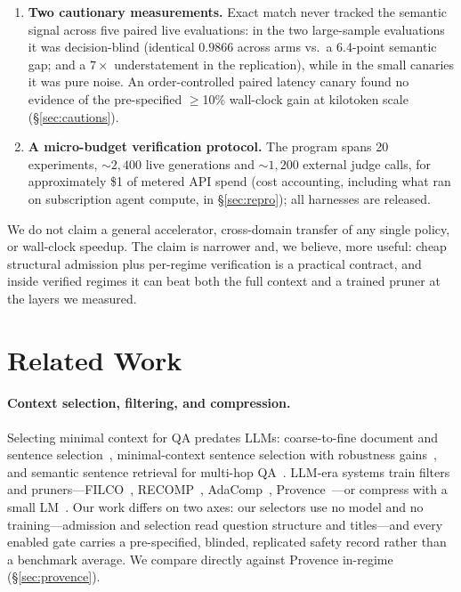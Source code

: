 \documentclass[11pt]{article}
\begin{document}
\begin{enumerate}
aggressive sentence pruners, and Provence may be out-of-domain here; full
caveats in \S\ref{sec:provence}.
\item \textbf{Two cautionary measurements.} Exact match never tracked the
semantic signal across five paired live evaluations: in the two large-sample
evaluations it was decision-blind (identical
$0.9866$ across arms vs.\ a 6.4-point semantic gap; and a $7\times$
understatement in the replication), while in the small canaries it was
pure noise. An order-controlled
paired latency canary found no evidence of the pre-specified
$\ge$10\% wall-clock gain at kilotoken scale (\S\ref{sec:cautions}).
\item \textbf{A micro-budget verification protocol.} The program spans 20
experiments, ${\sim}2{,}400$ live generations and ${\sim}1{,}200$ external
judge calls, for approximately \$1 of metered API spend (cost accounting,
including what ran on subscription agent compute, in \S\ref{sec:repro});
all harnesses are released.
\end{enumerate}

We do not claim a general accelerator, cross-domain transfer of any single
policy, or wall-clock speedup. The claim is narrower and, we believe, more
useful: cheap structural admission plus per-regime verification is a
practical contract, and inside verified regimes it can beat both the full
context and a trained pruner at the layers we measured.

\section{Related Work}

\paragraph{Context selection, filtering, and compression.} Selecting
minimal context for QA predates LLMs: coarse-to-fine document and sentence
selection~\citep{choi2017coarse}, minimal-context sentence selection with
robustness gains~\citep{min2018efficient}, and semantic sentence retrieval
for multi-hop QA~\citep{nie2019revealing}. LLM-era systems train filters
and pruners---FILCO~\citep{wang2023filco}, RECOMP~\citep{xu2024recomp},
AdaComp~\citep{zhang2024adacomp}, Provence~\citep{chirkova2025provence}---or
compress with a small LM~\citep{jiang2023llmlingua,jiang2024longllmlingua}.
Our work differs on two axes: our selectors use no model and no
training---admission and selection read question structure and titles---and
every enabled gate carries a pre-specified, blinded, replicated safety
record rather than a benchmark average. We compare directly against
Provence in-regime (\S\ref{sec:provence}).
\end{document}
